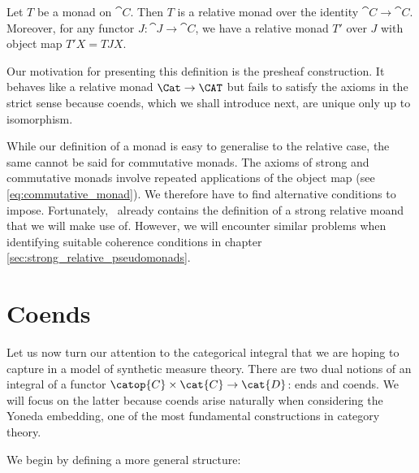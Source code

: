 \begin{example}
  Let $T$ be a monad on $\cat{C}$. Then $T$ is a relative monad over the identity
  $\cat{C}\to\cat{C}$. Moreover, for any functor $J:\cat{J}\to\cat{C}$, we have a
  relative monad $T'$ over $J$ with object map $T'X = TJX$.
\end{example}

Our motivation for presenting this definition is the presheaf construction. It
behaves like a relative monad $\Cat\to\CAT$ but fails to satisfy the axioms in
the strict sense because coends, which we shall introduce next, are unique only
up to isomorphism.

While our definition of a monad is easy to generalise to the relative case, the
same cannot be said for commutative monads. The axioms of strong and
commutative monads involve repeated applications of the object map (see
\ref{eq:commutative_monad}). We therefore have to find alternative conditions
to impose. Fortunately,~\cite{tarmo} already contains the definition of a
strong relative moand that we will make use of. However, we will encounter
similar problems when identifying suitable coherence conditions in chapter~
\ref{sec:strong_relative_pseudomonads}.

\section{Coends}\label{sec:coends}

Let us now turn our attention to the categorical integral that we are hoping to
capture in a model of synthetic measure theory. There are two dual notions of an
integral of a functor $\catop{C}\times\cat{C}\to\cat{D}$: ends and coends. We will
focus on the latter because coends arise naturally when considering the Yoneda
embedding, one of the most fundamental constructions in category theory.

We begin by defining a more general structure:

